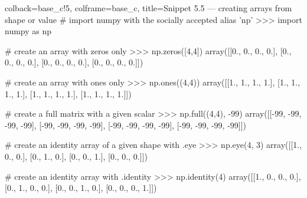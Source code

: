 \documentclass[a4paper,11pt]{book}
\begin{document}
\begin{pythoncode}[linenos=true,]{colback=base_c!5, colframe=base_c, title=\sffamily Snippet 5.5 --- creating arrays from shape or value}
# import numpy with the socially accepted alias 'np'
>>> import numpy as np

# create an array with zeros only
>>> np.zeros([4,4])
array([[0., 0., 0., 0.],
       [0., 0., 0., 0.],
       [0., 0., 0., 0.],
       [0., 0., 0., 0.]])

# create an array with ones only
>>> np.ones((4,4))
array([[1., 1., 1., 1.],
       [1., 1., 1., 1.],
       [1., 1., 1., 1.],
       [1., 1., 1., 1.]])

# create a full matrix with a given scalar
>>> np.full((4,4), -99)
array([[-99, -99, -99, -99],
       [-99, -99, -99, -99],
       [-99, -99, -99, -99],
       [-99, -99, -99, -99]])

# create an identity array of a given shape with .eye 
>>> np.eye(4, 3)
array([[1., 0., 0.],
       [0., 1., 0.],
       [0., 0., 1.],
       [0., 0., 0.]])

# create an identity array with .identity
>>> np.identity(4)
array([[1., 0., 0., 0.],
       [0., 1., 0., 0.],
       [0., 0., 1., 0.],
       [0., 0., 0., 1.]])
\end{pythoncode}
\clearpage
\end{document}
